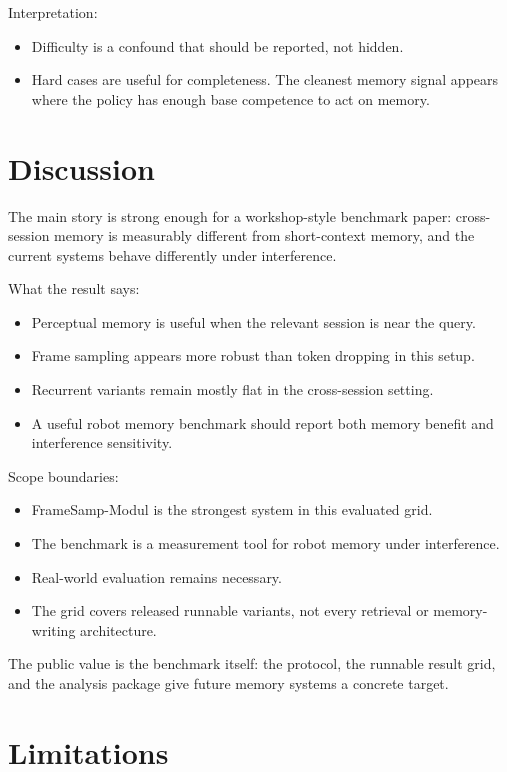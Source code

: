 \documentclass[10pt,letterpaper]{article}
\begin{document}
Interpretation:
\begin{itemize}
  \item Difficulty is a confound that should be reported, not hidden.
  \item Hard cases are useful for completeness. The cleanest memory signal appears where the policy has enough base competence to act on memory.
\end{itemize}

\section{Discussion}

The main story is strong enough for a workshop-style benchmark paper: cross-session memory is measurably different from short-context memory, and the current systems behave differently under interference.

What the result says:
\begin{itemize}
  \item Perceptual memory is useful when the relevant session is near the query.
  \item Frame sampling appears more robust than token dropping in this setup.
  \item Recurrent variants remain mostly flat in the cross-session setting.
  \item A useful robot memory benchmark should report both memory benefit and interference sensitivity.
\end{itemize}

Scope boundaries:
\begin{itemize}
  \item FrameSamp-Modul is the strongest system in this evaluated grid.
  \item The benchmark is a measurement tool for robot memory under interference.
  \item Real-world evaluation remains necessary.
  \item The grid covers released runnable variants, not every retrieval or memory-writing architecture.
\end{itemize}

The public value is the benchmark itself: the protocol, the runnable result grid, and the analysis package give future memory systems a concrete target.

\section{Limitations}
\end{document}
